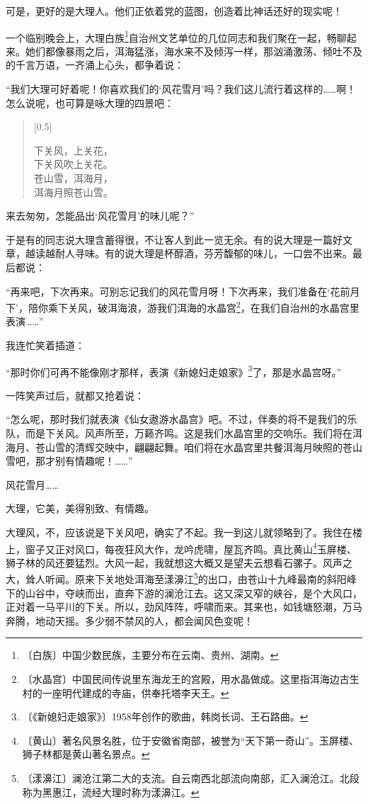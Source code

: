 \documentclass[12pt,UTF-8,openany]{ctexbook}
\begin{document}
\begin{normalsize}
    可是，更好的是大理人。他们正依着党的蓝图，创造着比神话还好的现实呢！
    
    一个临别晚会上，大理白族\footnote{〔白族〕中国少数民族，主要分布在云南、贵州、湖南。}自治州文艺单位的几位同志和我们聚在一起，畅聊起来。她们都像暴雨之后，洱海猛涨，海水来不及倾泻一样，那汹涌激荡、倾吐不及的千言万语，一齐涌上心头，都争着说：
    
    “我们大理可好着呢！你喜欢我们的‘风花雪月’吗？我们这儿流行着这样的……啊！怎么说呢，也可算是咏大理的四景吧：
    
    \begin{verse}[0.5\linewidth]
    
    下关风，上关花，\\ 下关风吹上关花。\\苍山雪，洱海月，\\洱海月照苍山雪。
    
    \end{verse}
    
    来去匆匆，怎能品出‘风花雪月’的味儿呢？”
    
    于是有的同志说大理含蓄得很，不让客人到此一览无余。有的说大理是一篇好文章，越读越耐人寻味。有的说大理是杯醇酒，芬芳馥郁的味儿，一口尝不出来。最后都说：
    
    “再来吧，下次再来。可别忘记我们的风花雪月呀！下次再来，我们准备在‘花前月下’，陪你乘下关风，破洱海浪，游我们洱海的水晶宫\footnote{〔水晶宫〕中国民间传说里东海龙王的宫殿，用水晶做成。这里指洱海边古生村的一座明代建成的寺庙，供奉托塔李天王。}，在我们自治州的水晶宫里表演……”
    
    我连忙笑着插道：
    
    “那时你们可再不能像刚才那样，表演《新媳妇走娘家》\footnote{〔《新媳妇走娘家》〕1958年创作的歌曲，韩岗长词、王石路曲。}了，那是水晶宫呀。”
    
    一阵笑声过后，就都又抢着说：
    
    “怎么呢，那时我们就表演《仙女遨游水晶宫》吧。不过，伴奏的将不是我们的乐队，而是下关风。风声所至，万籁齐鸣。这是我们水晶宫里的交响乐。我们将在洱海月、苍山雪的清辉交映中，翩翩起舞。咱们将在水晶宫里共餐洱海月映照的苍山雪吧，那才别有情趣呢！……”
    
    风花雪月……
    
    大理，它美，美得别致、有情趣。
    
    大理风，不，应该说是下关风吧，确实了不起。我一到这儿就领略到了。我住在楼上，窗子又正对风口，每夜狂风大作，龙吟虎啸，屋瓦齐鸣。真比黄山\footnote{〔黄山〕著名风景名胜，位于安徽省南部，被誉为“天下第一奇山”。玉屏楼、狮子林都是黄山著名景点。}玉屏楼、狮子林的风还要猛烈。大风一起，我就想这大概又是望夫云想看石骡子。风声之大，耸人听闻。原来下关地处洱海至漾濞江\footnote{〔漾濞江〕澜沧江第二大的支流。自云南西北部流向南部，汇入澜沧江。北段称为黑惠江，流经大理时称为漾濞江。}的出口，由苍山十九峰最南的斜阳峰下的山谷中，夺峡而出，直奔下游的澜沧江去。这又深又窄的峡谷，是个大风口，正对着一马平川的下关。所以，劲风阵阵，呼啸而来。其来也，如钱塘怒潮，万马奔腾，地动天摇。多少弱不禁风的人，都会闻风色变呢！
    

\end{normalsize}
\end{document}
